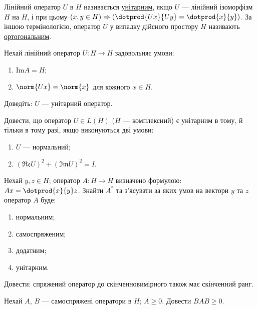 \begin{theory}
    Лінійний оператор $U$ в $H$ називається \uline{унітарним}, якщо
    $U$ --- лінійний ізоморфізм $H$ на $H$, і при цьому $(x, y \in H) \Rightarrow 
    \left(\dotprod{Ux}{Uy} = \dotprod{x}{y}\right)$. За іншою термінологією, оператор
    $U$ у випадку дійсного простору $H$ називають \uline{ортогональним}.
\end{theory}

\begin{exercise}
    Нехай лінійний оператор $U:H \to H$ задовольняє умови:
    \begin{enumerate}[label=\ukr*)]
        \item $\mathrm{Im}A = H$;
        \item $\norm{Ux} = \norm{x}$ для кожного $x \in H$.
    \end{enumerate}
    Доведіть: $U$ --- унітарний оператор.
\end{exercise}

\begin{exercise}
    Довести, що оператор $U \in L(H)$ ($H$ --- комплексний) є унітарним в тому,
    й тільки в тому разі, якщо виконуються дві умови:
    \begin{enumerate}[label=\ukr*)]
        \item $U$ --- нормальний;
        \item $(\mathfrak{Re}U)^2 + (\mathfrak{Im}U)^2 = I$.
    \end{enumerate}
\end{exercise}

\begin{exercise}
    Нехай $y, z \in H$; оператор $A: H \to H$ визначено формулою: $Ax = \dotprod{x}{y}z$.
    Знайти $A^*$ та з'ясувати за яких умов на вектори $y$ та $z$ оператор $A$ буде:
    \begin{enumerate}[label=\ukr*)]
        \item нормальним;
        \item самоспряженим;
        \item додатним;
        \item унітарним.
    \end{enumerate}
\end{exercise}

\begin{exercise}
    Довести: спряжений оператор до скінченновимірного також має скінченний ранг.
\end{exercise}

\begin{exercise}
    Нехай $A$, $B$ --- самоспряжені оператори в $H$; $A \geq 0$.
    Довести $BAB \geq 0$.
\end{exercise}